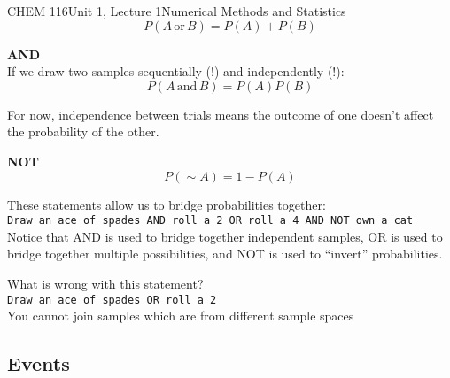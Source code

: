 \documentclass{article}
\begin{document}
\begin{tdoc}{CHEM 116}{Unit 1, Lecture 1}{Numerical Methods and Statistics}
\begin{equation}
P(A\,\textrm{or}\,B) = P(A) + P(B)
\end{equation}
\vspace{0.2cm}

{\bf AND}\vspace{0.5cm}\\

If we draw two samples sequentially (!) and independently (!):
\begin{equation}
P(A\,\textrm{and}\,B) = P(A)P(B)
\end{equation}

For now, independence between trials means the outcome of one doesn't
affect the probability of the other.

\vspace{0.2cm}

{\bf NOT}\vspace{0.5cm}\\

\begin{equation}
P(\sim A) = 1 - P(A)
\end{equation}
\vspace{0.2cm}

These statements allow us to bridge probabilities together:\vspace{0.2cm}\\

\texttt{Draw an ace of spades AND roll a 2 OR roll a 4 AND NOT own a cat}\\

\vspace{0.2cm}Notice that AND is used to bridge together independent samples, OR is
used to bridge together multiple possibilities, and NOT is used to
``invert'' probabilities.\vspace{0.2cm}

What is wrong with this statement? \vspace{0.2cm}\\

\texttt{Draw an ace of spades OR roll a 2}\vspace{0.2cm}\\

You cannot join samples which are from different sample spaces

\subsection{Events}


\end{tdoc}
\end{document}
